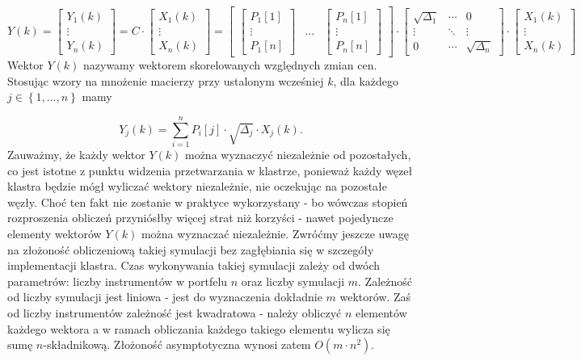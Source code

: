 \documentclass[12pt,titlepage]{article}
\numberwithin{equation}{section}
\begin{document}
\begin{equation} \label{eq:ynk}
Y(k)=
    \begin{bmatrix}
 Y_1(k) \\ 
\vdots \\
Y_n(k)
\end{bmatrix} =
C \cdot \begin{bmatrix}
 X_1(k) \\ 
\vdots \\
X_n(k)
\end{bmatrix} =
    \begin{bmatrix}
    \begin{bmatrix}P_1[1] \\ \vdots \\ P_1[n]\end{bmatrix} &
    \hdots &
    \begin{bmatrix}P_n[1] \\ \vdots \\ P_n[n]\end{bmatrix} 
\end{bmatrix}
    \cdot
\begin{bmatrix} \sqrt{\Delta_1} &  \cdots &0 \\
\vdots & \ddots  & \vdots \\ 0& \cdots & \sqrt{\Delta_n} \end{bmatrix}
    \cdot 
\begin{bmatrix}
 X_1(k) \\ 
\vdots \\
X_n(k)
\end{bmatrix}
\end{equation}
Wektor $Y(k)$ nazywamy wektorem skorelowanych względnych zmian cen. Stosując wzory na mnożenie macierzy przy ustalonym wcześniej $k$, dla każdego $j \in \left \{1, \hdots, n \right \} $ mamy
 
 
 \begin{equation}
     Y_j(k)=\sum_{i=1}^{n}P_i[j] \cdot \sqrt{\Delta_j}\cdot X_j(k).
 \end{equation}
Zauważmy, że każdy wektor $Y(k)$ można wyznaczyć niezależnie od pozostałych, co jest istotne z punktu widzenia przetwarzania w klastrze, ponieważ każdy węzeł klastra będzie mógł wyliczać wektory niezależnie, nie oczekując na pozostałe węzły. Choć ten fakt nie zostanie w praktyce wykorzystany - bo wówczas stopień rozproszenia obliczeń przyniósłby więcej strat niż korzyści - nawet pojedyncze elementy wektorów $Y(k)$ można wyznaczać niezależnie.
Zwróćmy jeszcze uwagę na złożoność obliczeniową takiej symulacji bez zagłębiania się w szczegóły implementacji klastra. Czas wykonywania takiej symulacji zależy od dwóch parametrów: liczby instrumentów w portfelu $n$ oraz liczby symulacji $m$. Zależność od liczby symulacji jest liniowa - jest do wyznaczenia dokładnie $m$ wektorów. Zaś od liczby instrumentów zależność jest kwadratowa - należy obliczyć $n$ elementów każdego wektora a w ramach obliczania każdego takiego elementu wylicza się sumę $n$-składnikową. Złożoność asymptotyczna wynosi zatem $O(m \cdot n^2)$.
\end{document}
